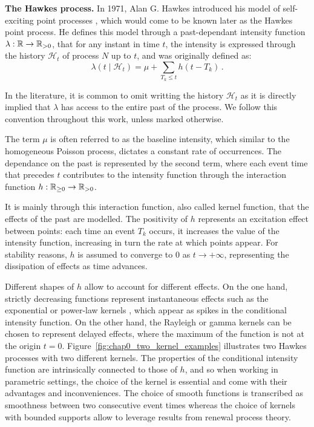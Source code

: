     \textbf{The Hawkes process.}
    In 1971, Alan G. Hawkes introduced his model of self-exciting point processes \parencite{Hawkes1971}, which would come to be known later as the Hawkes point process.
    He defines this model through a past-dependant intensity function $\lambda:{\mathbb R}\to{\mathbb R}_{>0}$, that for any instant in time $t$, the intensity is expressed through the history $\mathcal{H}_t$ of process $N$ up to $t$, and was originally defined as:
    \begin{equation}\label{eq:chap0_univariate_linear_intensity}
        \lambda(t\mid \mathcal{H}_t) = \mu + \sum_{T_k \leq t}{h(t-T_k)}\,.
    \end{equation}

    \begin{remark}
      In the literature, it is common to omit writting the history $\mathcal{H}_t$ as it is directly implied that $\lambda$ has access to the entire past of the process.
      We follow this convention throughout this work, unless marked otherwise.
    \end{remark}

    The term $\mu$ is often referred to as the baseline intensity, which similar to the homogeneous Poisson process, dictates a constant rate of occurrences. 
    The dependance on the past is represented by the second term, where each event time that precedes $t$ contributes to the intensity function through the interaction function $h:{\mathbb R}_{\geq0}\to{\mathbb R}_{>0}$.

    It is mainly through this interaction function, also called kernel function, that the effects of the past are modelled. 
    The positivity of $h$ represents an excitation effect between points: each time an event $T_k$ occurs, it increases the value of the intensity function, increasing in turn the rate at which points appear.
    For stability reasons, $h$ is assumed to converge to $0$ as $t\to+\infty$, representing the dissipation of effects as time advances.

    Different shapes of $h$ allow to account for different effects. 
    On the one hand, strictly decreasing functions represent instantaneous effects such as the exponential \parencite{Ozaki1979, Ogata1988} or power-law kernels \parencite{Zhang2016}, which appear as spikes in the conditional intensity function. 
    On the other hand, the Rayleigh or gamma kernels \parencite{Lesage2022} can be chosen to represent delayed effects, where the maximum of the function is not at the origin $t=0$. Figure~\ref{fig:chap0_two_kernel_examples} illustrates two Hawkes processes with two different kernels.
    The properties of the conditional intensity function are intrinsically connected to those of $h$, and so when working in parametric settings, the choice of the kernel is essential and come with their advantages and inconveniences.
    The choice of smooth functions is transcribed as smoothness between two consecutive event times whereas the choice of kernels with bounded supports allow to leverage results from renewal process theory.

